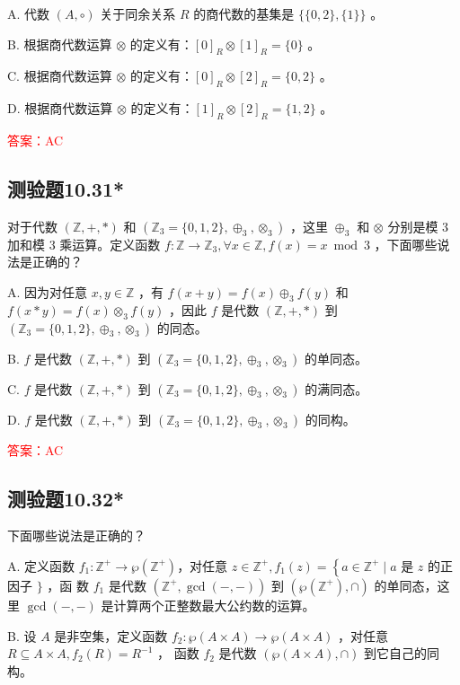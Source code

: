 \documentclass[UTF8, heading=true]{ctexart}
\begin{document}
A. 代数 $(A, \circ)$ 关于同余关系 $R$ 的商代数的基集是 $\{\{0,2\},\{1\}\}$ 。

B. 根据商代数运算 $\otimes$ 的定义有：$[0]_R \otimes[1]_R=\{0\}$ 。

C. 根据商代数运算 $\otimes$ 的定义有：$[0]_R \otimes[2]_R=\{0,2\}$ 。

D. 根据商代数运算 $\otimes$ 的定义有：$[1]_R \otimes[2]_R=\{1,2\}$ 。

\textcolor{red}{答案：AC}

\subsection{测验题10.31*}

对于代数 $(\mathbb{Z},+, *)$ 和 $\left(\mathbb{Z}_3=\{0,1,2\}, \oplus_3, \otimes_3\right)$ ，这里 $\oplus_3$ 和 $\otimes$ 分别是模 3 加和模 3 乘运算。定义函数 $f: \mathbb{Z} \rightarrow \mathbb{Z}_3, \forall x \in \mathbb{Z}, f(x)=x \bmod 3$ ，下面哪些说法是正确的？

A. 因为对任意 $x, y \in \mathbb{Z}$ ，有 $f(x+y)=f(x) \oplus_3 f(y)$ 和 $f(x * y)=f(x) \otimes_3 f(y)$ ，因此 $f$ 是代数 $(\mathbb{Z},+, *)$ 到 $\left(\mathbb{Z}_3=\{0,1,2\}, \oplus_3, \otimes_3\right)$ 的同态。

B. $f$ 是代数 $(\mathbb{Z},+, *)$ 到 $\left(\mathbb{Z}_3=\{0,1,2\}, \oplus_3, \otimes_3\right)$ 的单同态。

C. $f$ 是代数 $(\mathbb{Z},+, *)$ 到 $\left(\mathbb{Z}_3=\{0,1,2\}, \oplus_3, \otimes_3\right)$ 的满同态。

D. $f$ 是代数 $(\mathbb{Z},+, *)$ 到 $\left(\mathbb{Z}_3=\{0,1,2\}, \oplus_3, \otimes_3\right)$ 的同构。

\textcolor{red}{答案：AC}

\subsection{测验题10.32*}

下面哪些说法是正确的？

A. 定义函数 $f_1: \mathbb{Z}^{+} \rightarrow \wp\left(\mathbb{Z}^{+}\right)$，对任意 $z \in \mathbb{Z}^{+}, f_1(z)=\left\{a \in \mathbb{Z}^{+} \mid a\right.$ 是 $z$ 的正因子 $\}$ ，函
数 $f_1$ 是代数 $\left(\mathbb{Z}^{+}, \operatorname{gcd}(-,-)\right)$ 到 $\left(\wp\left(\mathbb{Z}^{+}\right), \cap\right)$ 的单同态，这里 $\operatorname{gcd}(-,-)$ 是计算两个正整数最大公约数的运算。

B. 设 $A$ 是非空集，定义函数 $f_2: \wp(A \times A) \rightarrow \wp(A \times A)$ ，对任意 $R \subseteq A \times A, f_2(R)=R^{-1}$ ，
函数 $f_2$ 是代数 $(\wp(A \times A), \cap)$ 到它自己的同构。
\end{document}
